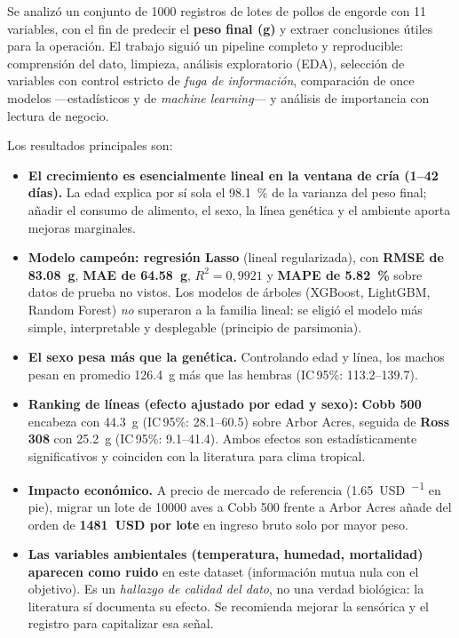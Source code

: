 \documentclass[11pt,a4paper]{article}
\begin{document}
Se analizó un conjunto de \num{1000} registros de lotes de pollos de engorde con \num{11} variables,
con el fin de predecir el \textbf{peso final (\si{\gram})} y extraer conclusiones útiles para la
operación. El trabajo siguió un pipeline completo y reproducible: comprensión del dato, limpieza,
análisis exploratorio (EDA), selección de variables con control estricto de \emph{fuga de información},
comparación de once modelos —estadísticos y de \emph{machine learning}— y análisis de importancia con
lectura de negocio.

\medskip
Los resultados principales son:

\begin{itemize}[leftmargin=1.4em,itemsep=3pt]
  \item \textbf{El crecimiento es esencialmente lineal en la ventana de cría (1--42 días).} La edad
        explica por sí sola el \SI{98.1}{\percent} de la varianza del peso final; añadir el consumo de
        alimento, el sexo, la línea genética y el ambiente aporta mejoras marginales.
  \item \textbf{Modelo campeón: regresión Lasso} (lineal regularizada), con
        \textbf{RMSE de \SI{83.08}{\gram}}, \textbf{MAE de \SI{64.58}{\gram}},
        \textbf{$R^2 = 0{,}9921$} y \textbf{MAPE de \SI{5.82}{\percent}} sobre datos de prueba no vistos.
        Los modelos de árboles (XGBoost, LightGBM, Random Forest) \emph{no} superaron a la familia
        lineal: se eligió el modelo más simple, interpretable y desplegable (principio de parsimonia).
  \item \textbf{El sexo pesa más que la genética.} Controlando edad y línea, los machos pesan en
        promedio \SI{+126.4}{\gram} más que las hembras (IC\,95\%: \numrange{113.2}{139.7}).
  \item \textbf{Ranking de líneas (efecto ajustado por edad y sexo):} \textbf{Cobb 500} encabeza con
        \SI{+44.3}{\gram} (IC\,95\%: \numrange{28.1}{60.5}) sobre Arbor Acres, seguida de
        \textbf{Ross 308} con \SI{+25.2}{\gram} (IC\,95\%: \numrange{9.1}{41.4}). Ambos efectos son
        estadísticamente significativos y coinciden con la literatura para clima tropical.
  \item \textbf{Impacto económico.} A precio de mercado de referencia (\SI{1.65}{USD\per\kilo} en pie),
        migrar un lote de \num{10000} aves a Cobb 500 frente a Arbor Acres añade del orden de
        \textbf{\SI{1481}{USD} por lote} en ingreso bruto solo por mayor peso.
  \item \textbf{Las variables ambientales (temperatura, humedad, mortalidad) aparecen como ruido} en
        este dataset (información mutua nula con el objetivo). Es un \emph{hallazgo de calidad del dato},
        no una verdad biológica: la literatura sí documenta su efecto. Se recomienda mejorar la
        sensórica y el registro para capitalizar esa señal.
\end{itemize}
\end{document}
